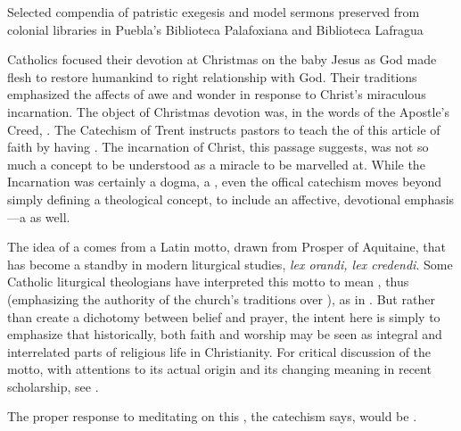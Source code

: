 \begin{table}
    \caption{Selected compendia of patristic exegesis and model sermons
    preserved from colonial libraries in Puebla's Biblioteca Palafoxiana and
    Biblioteca Lafragua}

    \label{tab:puebla-compendia}
\end{table}

Catholics focused their devotion at Christmas on the baby Jesus as God
made flesh to restore humankind to right relationship with God. 
Their traditions emphasized the affects of awe and wonder in response to
Christ's miraculous incarnation.
The object of Christmas devotion was, in the words of the Apostle's Creed,
.%
    \Autocites[34, 46]{Catholic:Catechismus1614}
The Catechism of Trent instructs pastors to teach the 
of this article of faith by having .%
    \Autocite[50]{Catholic:Catechismus1614}
The incarnation of Christ, this passage suggests, was not so much a concept to
be understood as a miracle to be marvelled at.
While the Incarnation was certainly a dogma, a , even the
offical catechism moves beyond simply defining a theological concept, to include
an affective, devotional emphasis---a  as
well.%
\begin{Footnote}
    The idea of a  comes from a Latin motto, drawn from
    Prosper of Aquitaine, that has become a standby in modern liturgical
    studies, \emph{lex orandi, lex credendi}.
    Some Catholic liturgical theologians have interpreted this motto to mean
    , thus (emphasizing
    the authority of the church's traditions over ), as
    in \autocite{Kavanagh:LiturgicalTheology}.
    But rather than create a dichotomy between belief and prayer, the intent
    here is simply to emphasize that historically, both faith and worship may be
    seen as integral and interrelated parts of religious life in Christianity.
    For critical discussion of the motto, with attentions to its actual origin
    and its changing meaning in recent scholarship, see
    \autocite{Irwin:LexOrandi}.
\end{Footnote}
The proper response to meditating on this , the
catechism says, would be .%
    \Autocite[50]{Catholic:Catechismus1614}


